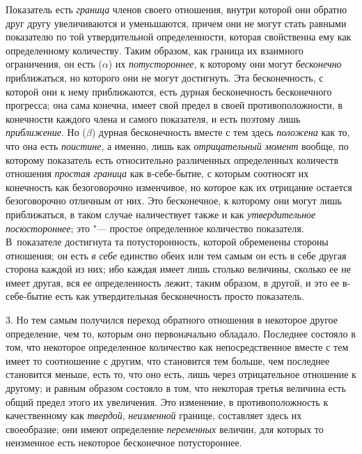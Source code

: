 Показатель есть {\em граница} членов своего отношения,
внутри которой они обратно друг другу увеличиваются и уменьшаются, причем
они не могут стать равными показателю по той утвердительной определенности,
которая свойственна ему как определенному количеству. Таким образом, как
граница их взаимного ограничения, он есть ({\em $\alpha
$}) их {\em потустороннее}, к которому они могут
{\em бесконечно} приближаться, но которого они не могут
достигнуть. Эта бесконечность, с которой они к нему приближаются, есть
дурная бесконечность бесконечного прогресса; она сама конечна, имеет свой
предел в своей противоположности, в конечности каждого члена и самого
показателя, и есть поэтому лишь {\em приближение}. Но
({\em $\beta $}) дурная бесконечность вместе с тем
здесь {\em положена} как то, что она есть
{\em поистине}, а именно, лишь как
{\em отрицательный момент} вообще, по которому
показатель есть относительно различенных определенных количеств отношения
{\em простая граница} как в-себе-бытие, с которым
соотносят их конечность как безоговорочно изменчивое, но которое как их
отрицание остается безоговорочно отличным от них. Это бесконечное, к
которому они могут лишь приближаться, в таком случае наличествует также и
как {\em утвердительное посюстороннее}; это "--- простое
определенное количество показателя. В~показателе достигнута та
потусторонность, которой обременены стороны отношения; он есть
{\em в себе} единство обеих или тем самым он есть в
себе другая сторона каждой из них; ибо каждая имеет лишь столько величины,
сколько ее не имеет другая, вся ее определенность лежит, таким образом, в
другой, и это ее в-себе-бытие есть как утвердительная бесконечность просто
показатель.

3. Но тем самым получился переход обратного отношения в некоторое другое
определение, чем то, которым оно первоначально обладало. Последнее состояло
в том, что некоторое определенное количество как непосредственное вместе с
тем имеет то соотношение с другим, что становится тем больше, чем последнее
становится меньше, есть то, что оно есть, лишь через отрицательное
отношение к другому; и равным образом состояло в том, что некоторая третья
величина есть общий предел этого их увеличения. Это изменение, в
противоположность к качественному как {\em твердой},
{\em неизменной} границе, составляет здесь их
своеобразие; они имеют определение {\em переменных}
величин, для которых то неизменное есть некоторое бесконечное
потустороннее.

